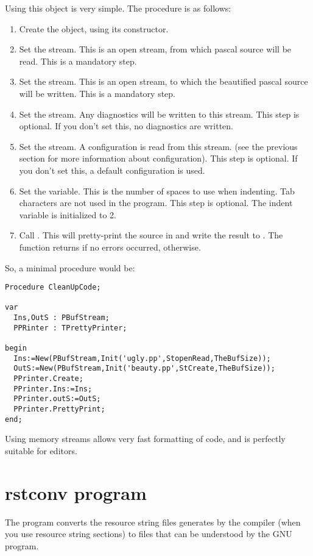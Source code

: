 Using this object is very simple. The procedure is as follows:
\begin{enumerate}
\item Create the object, using its constructor.
\item Set the  stream. This is an open stream, from which pascal source will be
read. This is a mandatory step.
\item Set the  stream. This is an open stream, to which the
beautified pascal source will be written. This is a mandatory step.
\item Set the  stream. Any diagnostics will be written to this
stream. This step is optional. If you don't set this, no diagnostics are
written.
\item Set the  stream. A configuration is read from this stream.
(see the previous section for more information about configuration). This
step is optional. If you don't set this, a default configuration is used.
\item Set the  variable. This is the number of spaces to use
when indenting. Tab characters are not used in the program. This step is
optional. The indent variable is initialized to 2.
\item Call . This will pretty-print the source in 
and write the result to . The function returns  if no
errors occurred,  otherwise.
\end{enumerate}

So, a minimal procedure would be:
\begin{verbatim}
Procedure CleanUpCode;

var
  Ins,OutS : PBufStream;
  PPRinter : TPrettyPrinter;

begin
  Ins:=New(PBufStream,Init('ugly.pp',StopenRead,TheBufSize));
  OutS:=New(PBufStream,Init('beauty.pp',StCreate,TheBufSize));
  PPrinter.Create;
  PPrinter.Ins:=Ins;
  PPrinter.outS:=OutS;
  PPrinter.PrettyPrint;
end;
\end{verbatim}

Using memory streams allows very fast formatting of code, and is perfectly
suitable for editors.

\section{rstconv program}

The  program converts the resource string files generates by
the compiler (when you use resource string sections) to  files
that can be understood by the GNU  program.

